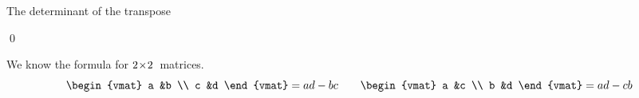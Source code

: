 \documentclass[10pt,t]{beamer}
\begin{document}
\begin{frame}{The determinant of the transpose}
\th[th:DetMatrixEqualsDetTrans]

\pf
{}
\end{frame}
\begin{frame}
\end{frame}
\begin{frame}
\qed

\pause
\ex
We know the formula for $2 \! \times \! 2$~matrices.
\begin{equation*}
  \begin{vmat}
    a  &b  \\
    c  &d
  \end{vmat}
  =ad-bc
  \qquad
  \begin{vmat}
    a  &c  \\
    b  &d
  \end{vmat}
  =ad-cb
\end{equation*}
\end{frame}







% 
\end{document}

